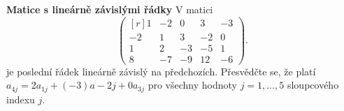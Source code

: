 \begin{mdframed}[style=mdexam]
  \begin{example}\label{MAI:exam082} 
    \textbf{Matice s lineárně závislými řádky}\newline
    V matici
    \begin{equation*}
      \begin{pmatrix*}[r]
          1 & -2 &  0 &  3 & -3  \\
         -2 &  1 &  3 & -2 &  0  \\
          1 &  2 & -3 & -5 &  1  \\
          8 & -7 & -9 & 12 & -6 
      \end{pmatrix*}.
    \end{equation*}
    je poslední řádek lineárně závislý na předchozích. Přesvědčte se, že platí \(a_{4j}= 2a_{1j} + 
    (-3)a - {2j} + 0a_{3j}\) pro všechny hodnoty \(j = 1, \ldots, 5\) sloupcového indexu \(j\).
  \end{example}
\end{mdframed}